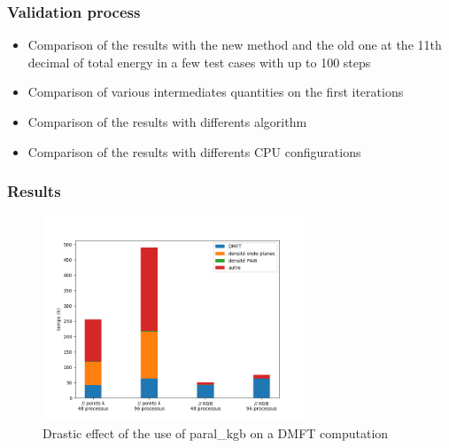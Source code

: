 \begin{frame}
  \frametitle{Validation process}
  \begin{itemize}
    \item Comparison of the results with the new method and the old one at the
      11th decimal of total energy in a few test cases with up to 100 steps
    \item Comparison of various intermediates quantities on the first iterations
    \item Comparison of the results with differents algorithm
    \item Comparison of the results with differents CPU configurations
  \end{itemize}
\end{frame}

\begin{frame}
  \frametitle{Results}
  \begin{figure}[ht]
    \centering
    \includegraphics[width=0.7\textwidth]{pic/bargraph.png}
    \caption{Drastic effect of the use of paral\_kgb on a DMFT computation}
    \label{fig:bargraph.png}
  \end{figure}
\end{frame}
